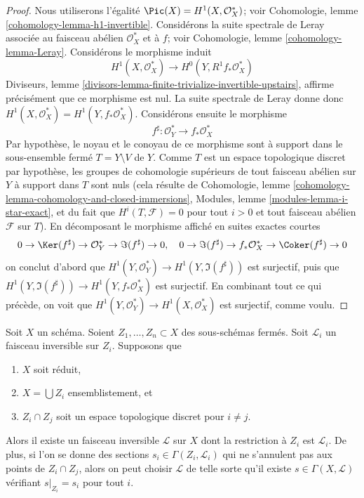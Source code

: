 \begin{proof}
Nous utiliserons l'égalité $\Pic(X) = H^1(X, \mathcal{O}_X^*)$; voir
Cohomologie, lemme \ref{cohomology-lemma-h1-invertible}.
Considérons la suite spectrale de Leray associée au faisceau abélien $\mathcal{O}_X^*$
et à $f$; voir Cohomologie, lemme \ref{cohomology-lemma-Leray}.
Considérons le morphisme induit
$$
H^1(X, \mathcal{O}_X^*) \longrightarrow H^0(Y, R^1f_*\mathcal{O}_X^*)
$$
Diviseurs, lemme \ref{divisors-lemma-finite-trivialize-invertible-upstairs},
affirme précisément que ce morphisme est nul. La suite spectrale de Leray donne donc
$H^1(X, \mathcal{O}_X^*) = H^1(Y, f_*\mathcal{O}_X^*)$.
Considérons ensuite le morphisme
$$
f^\sharp : \mathcal{O}_Y^* \longrightarrow f_*\mathcal{O}_X^*
$$
Par hypothèse, le noyau et le conoyau de ce morphisme sont à support
dans le sous-ensemble fermé $T = Y \setminus V$ de $Y$.
Comme $T$ est un espace topologique discret par hypothèse,
les groupes de cohomologie supérieurs de tout faisceau abélien sur $Y$ à support
dans $T$ sont nuls (cela résulte de
Cohomologie, lemme \ref{cohomology-lemma-cohomology-and-closed-immersions},
Modules, lemme \ref{modules-lemma-i-star-exact}, et
du fait que $H^i(T, \mathcal{F}) = 0$ pour tout $i > 0$
et tout faisceau abélien $\mathcal{F}$ sur $T$).
En décomposant le morphisme affiché en suites exactes courtes
$$
0 \to \Ker(f^\sharp) \to \mathcal{O}_Y^* \to \Im(f^\sharp) \to 0,\quad
0 \to \Im(f^\sharp) \to f_*\mathcal{O}_X^* \to \Coker(f^\sharp) \to 0
$$
on conclut d'abord que $H^1(Y, \mathcal{O}_Y^*) \to H^1(Y, \Im(f^\sharp))$
est surjectif, puis que
$H^1(Y, \Im(f^\sharp)) \to H^1(Y, f_*\mathcal{O}_X^*)$ est surjectif.
En combinant tout ce qui précède, on voit que $H^1(Y, \mathcal{O}_Y^*) \to
H^1(X, \mathcal{O}_X^*)$ est surjectif, comme voulu.
\end{proof}

\begin{lemma}
\label{lemma-glue-invertible-sheaves}
Soit $X$ un schéma. Soient $Z_1, \ldots, Z_n \subset X$ des sous-schémas
fermés. Soit $\mathcal{L}_i$ un faisceau inversible sur $Z_i$.
Supposons que
\begin{enumerate}
\item $X$ soit réduit,
\item $X = \bigcup Z_i$ ensemblistement, et
\item $Z_i \cap Z_j$ soit un espace topologique discret pour $i \not = j$.
\end{enumerate}
Alors il existe un faisceau inversible $\mathcal{L}$ sur $X$ dont la restriction
à $Z_i$ est $\mathcal{L}_i$. De plus, si l'on se donne des sections
$s_i \in \Gamma(Z_i, \mathcal{L}_i)$ qui ne s'annulent pas aux
points de $Z_i \cap Z_j$, alors on peut choisir $\mathcal{L}$ de telle sorte
qu'il existe $s \in \Gamma(X, \mathcal{L})$ vérifiant
$s|_{Z_i} = s_i$ pour tout $i$.
\end{lemma}

